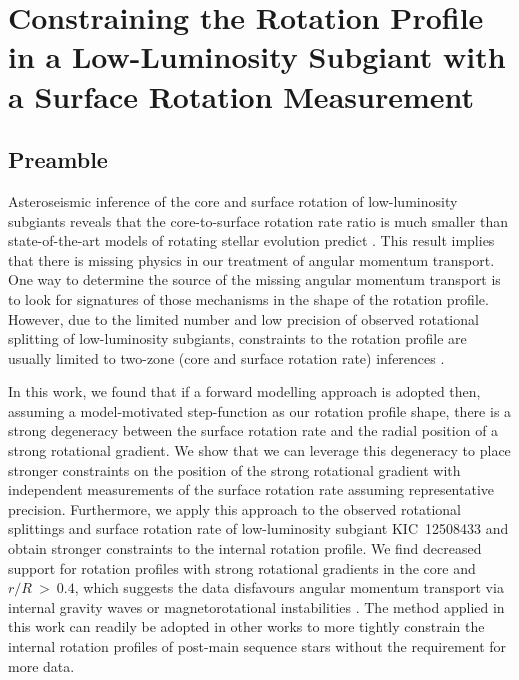 \let\cleardoublepage=\clearpage

\chapter{Constraining the Rotation Profile in a Low-Luminosity Subgiant with a Surface Rotation Measurement}
\label{chap:subgiant_ast}

\section*{Preamble}

Asteroseismic inference of the core and surface rotation of low-luminosity subgiants reveals that the core-to-surface rotation rate ratio is much smaller than state-of-the-art models of rotating stellar evolution predict \citep{deheuvels_seismic_2014, cantiello_angular_2014, eggenberger_asteroseismology_2019}.
This result implies that there is missing physics in our treatment of angular momentum transport.
One way to determine the source of the missing angular momentum transport is to look for signatures of those mechanisms in the shape of the rotation profile.
However, due to the limited number and low precision of observed rotational splitting of low-luminosity subgiants, constraints to the rotation profile are usually limited to two-zone (core and surface rotation rate) inferences \citep{deheuvels_seismic_2014}.

In this work, we found that if a forward modelling approach is adopted then, assuming a model-motivated step-function as our rotation profile shape, there is a strong degeneracy between the surface rotation rate and the radial position of a strong rotational gradient.
We show that we can leverage this degeneracy to place stronger constraints on the position of the strong rotational gradient with independent measurements of the surface rotation rate assuming representative precision.
Furthermore, we apply this approach to the observed rotational splittings and surface rotation rate of low-luminosity subgiant KIC~12508433 and obtain stronger constraints to the internal rotation profile.
We find decreased support for rotation profiles with strong rotational gradients in the core and $r/R\ > \ 0.4$, which suggests the data disfavours angular momentum transport via internal gravity waves \citep[e.g.,][]{pincon_can_2017} or magnetorotational instabilities \citep[e.g.,][]{spada_angular_2016,menou_magnetorotational_2006}.
The method applied in this work can readily be adopted in other works to more tightly constrain the internal rotation profiles of post-main sequence stars without the requirement for more data.

